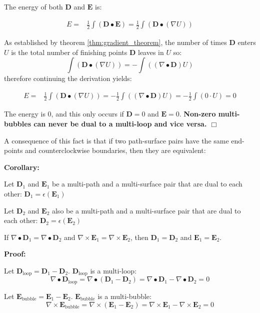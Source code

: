 The energy of both \(\mathbf{D}\) and \(\mathbf{E}\) is:

\begin{align*}
E = & \frac{1}{2}\int (\mathbf{D} \bullet \mathbf{E}) 
= \frac{1}{2} \int (\mathbf{D} \bullet (\nabla U)) 
\end{align*} 

As established by theorem \ref{thm:gradient_theorem}, the number of times \(\mathbf{D}\) enters \(U\) is the total number of finishing points \(\mathbf{D}\) leaves in \(U\) so: 
\[\int (\mathbf{D} \bullet (\nabla U)) = -\int ((\nabla \bullet \mathbf{D}) U)\] 
therefore continuing the derivation yields:

\begin{align*}
E = & \frac{1}{2} \int (\mathbf{D} \bullet (\nabla U)) 
= -\frac{1}{2} \int ((\nabla \bullet \mathbf{D}) U) 
= -\frac{1}{2} \int (0 \cdot U) 
= 0
\end{align*}

The energy is \(0\), and this only occurs if \(\mathbf{D} = 0\) and \(\mathbf{E} = 0\). {\bf Non-zero multi-bubbles can never be dual to a multi-loop and vice versa. \(\Box\)}


A consequence of this fact is that if two path-surface pairs have the same end-points and counterclockwise boundaries, then they are equivalent: 

\textbf{Corollary:}

Let \(\mathbf{D}_1\) and \(\mathbf{E}_1\) be a multi-path and a multi-surface pair that are dual to each other: \(\mathbf{D}_1 = \epsilon(\mathbf{E}_1)\)

Let \(\mathbf{D}_2\) and \(\mathbf{E}_2\) also be a multi-path and a multi-surface pair that are dual to each other: \(\mathbf{D}_2 = \epsilon(\mathbf{E}_2)\)

If \(\nabla \bullet \mathbf{D}_1 = \nabla \bullet \mathbf{D}_2\) and \(\nabla \times \mathbf{E}_1 = \nabla \times \mathbf{E}_2\), then \(\mathbf{D}_1 = \mathbf{D}_2\) and \(\mathbf{E}_1 = \mathbf{E}_2\).   

\textbf{Proof:}

Let \(\mathbf{D}_{\text{loop}} = \mathbf{D}_1 - \mathbf{D}_2\). \(\mathbf{D}_{\text{loop}}\) is a multi-loop:
\[\nabla \bullet \mathbf{D}_{\text{loop}} = \nabla \bullet (\mathbf{D}_1 - \mathbf{D}_2) = \nabla \bullet \mathbf{D}_1 - \nabla \bullet \mathbf{D}_2 = 0\]

Let \(\mathbf{E}_{\text{bubble}} = \mathbf{E}_1 - \mathbf{E}_2\). \(\mathbf{E}_{\text{bubble}}\) is a multi-bubble: 
\[\nabla \times \mathbf{E}_{\text{bubble}} = \nabla \times (\mathbf{E}_1 - \mathbf{E}_2) = \nabla \times \mathbf{E}_1 - \nabla \times \mathbf{E}_2 = 0\]


